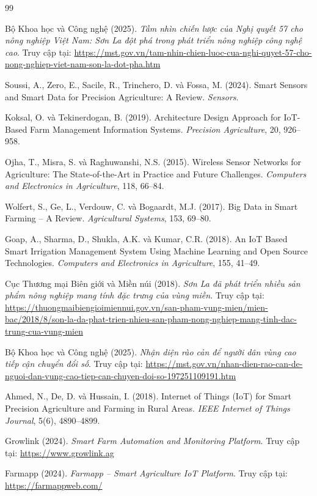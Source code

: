 \documentclass[13pt,a4paper]{extarticle}
\numberwithin{figure}{section}
\numberwithin{table}{section}
\begin{document}
	\newpage
	\begin{thebibliography}{99}
		
		Bộ Khoa học và Công nghệ (2025). \textit{Tầm nhìn chiến lược của Nghị quyết 57 cho nông nghiệp Việt Nam: Sơn La đột phá trong phát triển nông nghiệp công nghệ cao}. Truy cập tại: \url{https://mst.gov.vn/tam-nhin-chien-luoc-cua-nghi-quyet-57-cho-nong-nghiep-viet-nam-son-la-dot-pha.htm}
		
		Soussi, A., Zero, E., Sacile, R., Trinchero, D. và Fossa, M. (2024). Smart Sensors and Smart Data for Precision Agriculture: A Review. \textit{Sensors}.
		
		Koksal, O. và Tekinerdogan, B. (2019). Architecture Design Approach for IoT-Based Farm Management Information Systems. \textit{Precision Agriculture}, 20, 926--958.
		
		Ojha, T., Misra, S. và Raghuwanshi, N.S. (2015). Wireless Sensor Networks for Agriculture: The State-of-the-Art in Practice and Future Challenges. \textit{Computers and Electronics in Agriculture}, 118, 66--84.
		
		Wolfert, S., Ge, L., Verdouw, C. và Bogaardt, M.J. (2017). Big Data in Smart Farming -- A Review. \textit{Agricultural Systems}, 153, 69--80.
		
		Goap, A., Sharma, D., Shukla, A.K. và Kumar, C.R. (2018). An IoT Based Smart Irrigation Management System Using Machine Learning and Open Source Technologies. \textit{Computers and Electronics in Agriculture}, 155, 41--49.
		
		Cục Thương mại Biên giới và Miền núi (2018). \textit{Sơn La đã phát triển nhiều sản phẩm nông nghiệp mang tính đặc trưng của vùng miền}. Truy cập tại: \url{https://thuongmaibiengioimiennui.gov.vn/san-pham-vung-mien/mien-bac/2018/8/son-la-da-phat-trien-nhieu-san-pham-nong-nghiep-mang-tinh-dac-trung-cua-vung-mien}
		
		Bộ Khoa học và Công nghệ (2025). \textit{Nhận diện rào cản để người dân vùng cao tiếp cận chuyển đổi số}. Truy cập tại: \url{https://mst.gov.vn/nhan-dien-rao-can-de-nguoi-dan-vung-cao-tiep-can-chuyen-doi-so-197251109191.htm}
		
		Ahmed, N., De, D. và Hussain, I. (2018). Internet of Things (IoT) for Smart Precision Agriculture and Farming in Rural Areas. \textit{IEEE Internet of Things Journal}, 5(6), 4890--4899.
		
		Growlink (2024). \textit{Smart Farm Automation and Monitoring Platform}. Truy cập tại: \url{https://www.growlink.ag}
		
		Farmapp (2024). \textit{Farmapp -- Smart Agriculture IoT Platform}. Truy cập tại: \url{https://farmappweb.com/}
		
	\end{thebibliography}
	
\end{document}
